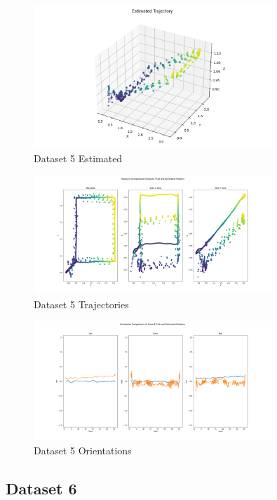 \documentclass{article}
\begin{document}
\begin{figure}[H]
    \centering
    \includegraphics[width=0.8\textwidth]{./imgs/task1_2/studentdata5_estimated.png}
    \caption{Dataset 5 Estimated}
\end{figure}

\begin{figure}[H]
    \centering
    \includegraphics[width=0.8\textwidth]{./imgs/task1_2/studentdata5_trajectory_merged.png}
    \caption{Dataset 5 Trajectories}
\end{figure}

\begin{figure}[H]
    \centering
    \includegraphics[width=0.8\textwidth]{./imgs/task1_2/studentdata5_orientation_merged.png}
    \caption{Dataset 5 Orientations}
\end{figure}

\subsection*{Dataset 6}
\end{document}
